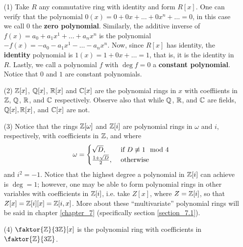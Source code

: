 \begin{example}\label{example_5.6}
    \begin{enumerate}
        \item[(1)] Take $R$ any commutative ring with identity and form $R[x]$.
            One can verify that the polynomial $0(x)=0+0x+\dots+0x^n+\dots=0$,
            in this case we call $0$ the \textbf{zero polynomial}. Similarly,
            the additive inverse of $f(x)=a_0+a_1x^1+\dots+a_nx^n$ is the
            polynomial $-f(x)=-a_0-a_1x^1-\dots-a_nx^n$. Now, since $R[x]$ has
            identity, the \textbf{identity} polynomial is $1(x)=1+0x+\dots=1$,
            that is, it is the identity in $R$. Lastly, we call a polynomial $f$
            with  $\deg{f}=0$ a \textbf{constant polynomial}. Notice that $0$
            and  $1$ are constant polynomials.

        \item[(2)] $\mathbb{Z}[x]$, $\mathbb{Q}[x]$, $\mathbb{R}[x]$ and $\mathbb{C}[x]$ are the polynomial
            rings in $x$ with coeffiients in $\mathbb{Z}$, $\mathbb{Q}$, $\mathbb{R}$, and $\mathbb{C}$
            respectively. Observe also that while $\mathbb{Q}$, $\mathbb{R}$, and $\mathbb{C}$
            are fields, $\mathbb{Q}[x],\mathbb{R}[x]$, and $\mathbb{C}[x]$ are not.

        \item[(3)] Notice that the rings $\mathbb{Z}[\omega]$ and $\mathbb{Z}[i]$ are polynomial
            rings in $\omega$ and  $i$, respectively, with coefficients in $\mathbb{Z}$,
            and where
            \begin{equation*}
              \omega=
              \begin{cases}
                \sqrt{D}, & \text{ if } D \not\equiv 1 \mod{4}  \\
                \frac{1+\sqrt{D}}{2}, & \text{ otherwise} \\
              \end{cases}
            \end{equation*}
            and $i^2=-1$. Notice that
            the highest degree a polynomial in  $\mathbb{Z}[i]$ can achieve is $\deg=1$;
            however, one may be able to form polynomial rings in other variables
            with coefficients in $\mathbb{Z}[i]$, i.e. take $Z[x]$, where
            $Z=\mathbb{Z}[i]$, so that $Z[x]=\mathbb{Z}[i][x]=\mathbb{Z}[i,x]$. More about
            these ``multivariate'' polynomial rings will be said in
            chapter \ref{chapter_7} (specifically section
            \ref{section_7.1}).

        \item[(4)] $\faktor{\Z}{3\Z}[x]$ is the polynomial ring with
            coefficients in $\faktor{\Z}{3\Z}$.
    \end{enumerate}
\end{example}

